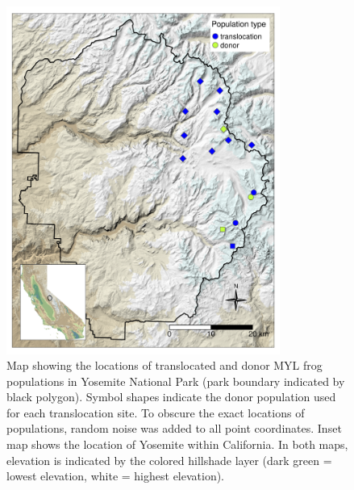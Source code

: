\documentclass[9pt,twoside,lineno]{pnas-new}
\begin{document}
\newpage

\begin{figure}

{\centering \includegraphics[width=0.8\textwidth]{figures/map_translocation_points.png}

}

\caption{\label{fig-yosemap}Map showing the locations of translocated
and donor MYL frog populations in Yosemite National Park (park boundary
indicated by black polygon). Symbol shapes indicate the donor population
used for each translocation site. To obscure the exact locations of
populations, random noise was added to all point coordinates. Inset map
shows the location of Yosemite within California. In both maps,
elevation is indicated by the colored hillshade layer (dark green =
lowest elevation, white = highest elevation). }

\end{figure}\clearpage
\end{document}

